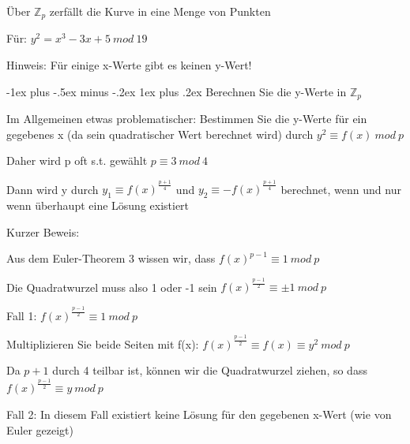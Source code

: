 \documentclass[a4paper]{article}
\makeatletter
\renewcommand{\subsubsection}{\@startsection{subsubsection}{3}{0mm}%
 {-1ex plus -.5ex minus -.2ex}%
 {1ex plus .2ex}%
 {\normalfont\small\bfseries}}
\makeatother
\begin{document}
\begin{multicols}{3}
      \begin{itemize*}
            \item Über $\mathbb{Z}_p$ zerfällt die Kurve in eine
            Menge von Punkten
            \item Für: $y^2=x^3-3x+5\ mod\ 19$
            \begin{itemize*}
                  \item Hinweis: Für einige x-Werte gibt es keinen y-Wert!
            \end{itemize*}
      \end{itemize*}


      \subsubsection{Berechnen Sie die y-Werte in
            $\mathbb{Z}_p$}

      \begin{itemize*}
            \item Im Allgemeinen etwas problematischer: Bestimmen Sie die y-Werte für
            ein gegebenes x (da sein quadratischer Wert berechnet wird) durch
            $y^2\equiv f(x)\ mod\ p$
            \item Daher wird p oft s.t. gewählt $p\equiv 3\ mod\ 4$
            \item Dann wird y durch $y_1\equiv
                  f(x)^{\frac{p+1}{4}}$ und
            $y_2\equiv
                  -f(x)^{\frac{p+1}{4}}$ berechnet, wenn und nur
            wenn überhaupt eine Lösung existiert
            \item Kurzer Beweis:
            \begin{itemize*}
                  \item Aus dem Euler-Theorem 3 wissen wir, dass $f(x)^{p-1}\equiv 1\ mod\ p$
                  \item Die Quadratwurzel muss also 1 oder -1 sein $f(x)^{\frac{p-1}{2}}\equiv\pm 1\ mod\ p$
            \end{itemize*}
            \item Fall 1:
            $f(x)^{\frac{p-1}{2}}\equiv1\ mod\ p$
            \begin{itemize*}
                  \item Multiplizieren Sie beide Seiten mit f(x): $f(x)^{\frac{p-1}{2}}\equiv f(x)\equiv y^2\ mod\ p$
                  \item Da $p + 1$ durch 4 teilbar ist, können wir die Quadratwurzel ziehen, so dass $f(x)^{\frac{p-1}{2}}\equiv y\ mod\ p$
            \end{itemize*}
            \item Fall 2: In diesem Fall existiert keine Lösung für den gegebenen x-Wert
            (wie von Euler gezeigt)
      \end{itemize*}



\end{multicols}
\end{document}
